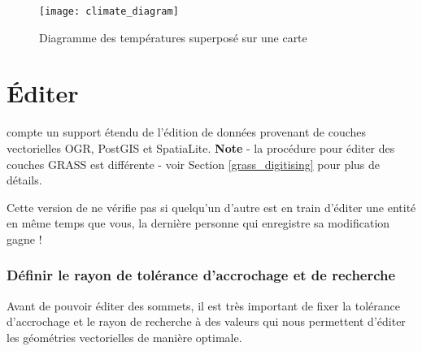 \begin{figure}[ht]
   \begin{center}
   \texttt{[image: climate\_diagram]}
   \caption{Diagramme des températures superposé sur une carte \nixcaption}
   \label{fig:climatediagram}
\end{center}
\end{figure}

\section{Éditer}

\qg compte un support étendu de l'édition de données provenant de couches 
vectorielles OGR, PostGIS et SpatiaLite. \textbf{Note} - la procédure pour éditer 
des couches GRASS est différente - voir Section \ref{grass_digitising} pour plus 
de détails.

\begin{Tip}[ht]\caption{\textsc{Éditions concurrentes}}
Cette version de \qg ne vérifie pas si quelqu'un d'autre est en train d'éditer 
une entité en même temps que vous, la dernière personne qui enregistre sa 
modification gagne !
\end{Tip}

\subsubsection{Définir le rayon de tolérance d'accrochage et de recherche}
\label{snapping_tolerance}

Avant de pouvoir éditer des sommets, il est très important de fixer la tolérance 
d'accrochage et le rayon de recherche à des valeurs qui nous permettent d'éditer 
les géométries vectorielles de manière optimale.

